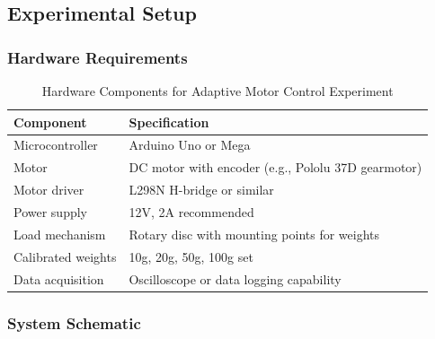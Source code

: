 \subsection{Experimental Setup}

\subsubsection{Hardware Requirements}

\begin{table}[H]
\centering
\caption{Hardware Components for Adaptive Motor Control Experiment}
\begin{tabular}{ll}
\toprule
\textbf{Component} & \textbf{Specification} \\
\midrule
Microcontroller & Arduino Uno or Mega \\
Motor & DC motor with encoder (e.g., Pololu 37D gearmotor) \\
Motor driver & L298N H-bridge or similar \\
Power supply & 12V, 2A recommended \\
Load mechanism & Rotary disc with mounting points for weights \\
Calibrated weights & 10g, 20g, 50g, 100g set \\
Data acquisition & Oscilloscope or data logging capability \\
\bottomrule
\end{tabular}
\end{table}

\subsubsection{System Schematic}

